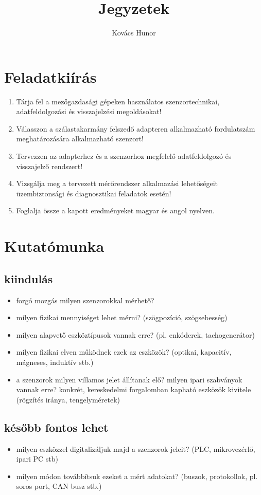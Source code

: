 \documentclass{article}
\title{Jegyzetek}
\author{Kovács Hunor}
\begin{document}
	\maketitle
	
	\section{Feladatkiírás}
	
	\begin{enumerate}
		
		\item Tárja fel a mezőgazdasági gépeken használatos szenzortechnikai, adatfeldolgozási és visszajelzési megoldásokat!
		\item Válasszon a szálastakarmány felszedő adapteren alkalmazható fordulatszám meghatározására alkalmazható szenzort!
		\item Tervezzen az adapterhez és a szenzorhoz megfelelő adatfeldolgozó és visszajelző rendszert!
		\item Vizsgálja meg a tervezett mérőrendszer alkalmazási lehetőségeit üzembiztonsági és diagnosztikai feladatok esetén!
		\item Foglalja össze a kapott eredményeket magyar és angol nyelven.
	\end{enumerate}
	
	\section{Kutatómunka}
	\subsection{kiindulás}
	\begin{itemize}
		\item forgó mozgás milyen szenzorokkal mérhető?
		\item milyen fizikai mennyiséget lehet mérni? (szögpozíció, szögsebesség)
		\item milyen alapvető eszköztípusok vannak erre? (pl. enkóderek, tachogenerátor)
		\item milyen fizikai elven működnek ezek az eszközök? (optikai, kapacitív, mágneses, induktív stb.)
		\item a szenzorok milyen villamos jelet állítanak elő? milyen ipari szabványok vannak erre?
		konkrét, kereskedelmi forgalomban kapható eszközök kivitele (rögzítés iránya, tengelyméretek)
	\end{itemize}
	
	\subsection{később fontos lehet}
	\begin{itemize}
		\item milyen eszközzel digitalizáljuk majd a szenzorok jeleit? (PLC, mikrovezérlő, ipari PC stb)
		\item milyen módon továbbítsuk ezeket a mért adatokat? (buszok, protokollok, pl. soros port, CAN busz stb.)
	\end{itemize}
	
\end{document}
